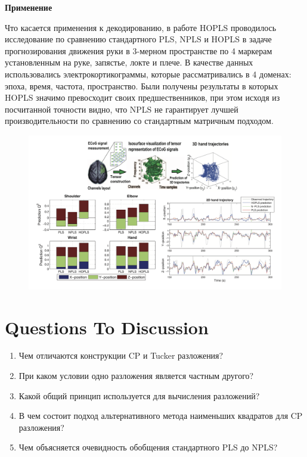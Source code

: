 \textbf{Применение}

Что касается применения к декодированию, в работе HOPLS проводилось исследование по сравнению стандартного PLS, NPLS и HOPLS в задаче прогнозирования движения руки в 3-мерном пространстве по 4 маркерам установленным на руке, запястье, локте и плече. В качестве данных использовались электрокортикограммы, которые рассматривались в 4 доменах: эпоха, время, частота, пространство. Были получены результаты в которых HOPLS значимо превосходит своих предшественников, при этом исходя из посчитанной точности видно, что NPLS не гарантирует лучшей производительности по сравнению со стандартным матричным подходом.

\begin{figure}[h]
    \centering
    \includegraphics[scale=0.65]{chapters/varenik2/images/result.png}
\end{figure}

\section{Questions To Discussion}
\begin{enumerate}
    \item Чем отличаются конструкции CP и Tucker разложения?
    \item При каком условии одно разложения является частным другого?
    \item Какой общий принцип используется для вычисления разложений?
    \item В чем состоит подход альтернативного метода наименьших квадратов для CP разложения?
    \item Чем объясняется очевидность обобщения стандартного PLS до NPLS?
\end{enumerate}